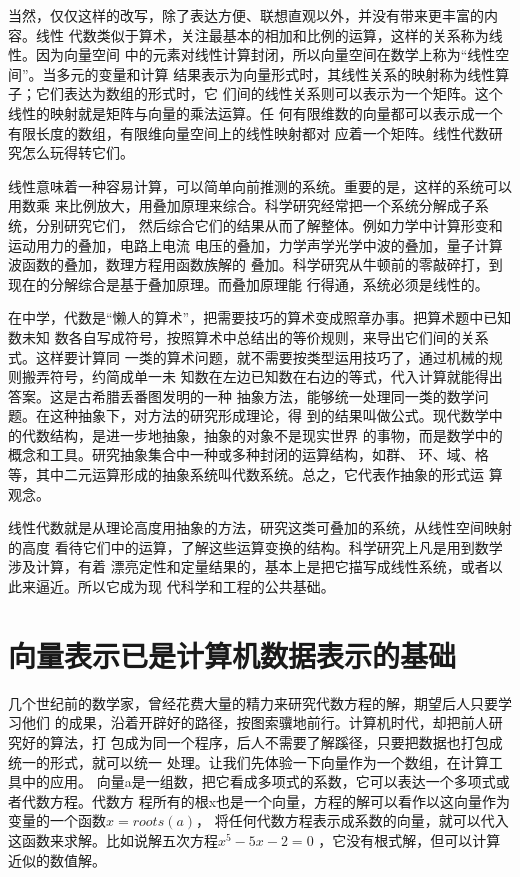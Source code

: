 当然，仅仅这样的改写，除了表达方便、联想直观以外，并没有带来更丰富的内容。线性
代数类似于算术，关注最基本的相加和比例的运算，这样的关系称为线性。因为向量空间
中的元素对线性计算封闭，所以向量空间在数学上称为``线性空间''。当多元的变量和计算
结果表示为向量形式时，其线性关系的映射称为线性算子；它们表达为数组的形式时，它
们间的线性关系则可以表示为一个矩阵。这个线性的映射就是矩阵与向量的乘法运算。任
何有限维数的向量都可以表示成一个有限长度的数组，有限维向量空间上的线性映射都对
应着一个矩阵。线性代数研究怎么玩得转它们。

线性意味着一种容易计算，可以简单向前推测的系统。重要的是，这样的系统可以用数乘
来比例放大，用叠加原理来综合。科学研究经常把一个系统分解成子系统，分别研究它们，
然后综合它们的结果从而了解整体。例如力学中计算形变和运动用力的叠加，电路上电流
电压的叠加，力学声学光学中波的叠加，量子计算波函数的叠加，数理方程用函数族解的
叠加。科学研究从牛顿前的零敲碎打，到现在的分解综合是基于叠加原理。而叠加原理能
行得通，系统必须是线性的。

在中学，代数是``懒人的算术''，把需要技巧的算术变成照章办事。把算术题中已知数未知
数各自写成符号，按照算术中总结出的等价规则，来导出它们间的关系式。这样要计算同
一类的算术问题，就不需要按类型运用技巧了，通过机械的规则搬弄符号，约简成单一未
知数在左边已知数在右边的等式，代入计算就能得出答案。这是古希腊丢番图发明的一种
抽象方法，能够统一处理同一类的数学问题。在这种抽象下，对方法的研究形成理论，得
到的结果叫做公式。现代数学中的代数结构，是进一步地抽象，抽象的对象不是现实世界
的事物，而是数学中的概念和工具。研究抽象集合中一种或多种封闭的运算结构，如群、
环、域、格等，其中二元运算形成的抽象系统叫代数系统。总之，它代表作抽象的形式运
算观念。

线性代数就是从理论高度用抽象的方法，研究这类可叠加的系统，从线性空间映射的高度
看待它们中的运算，了解这些运算变换的结构。科学研究上凡是用到数学涉及计算，有着
漂亮定性和定量结果的，基本上是把它描写成线性系统，或者以此来逼近。所以它成为现
代科学和工程的公共基础。

\section{向量表示已是计算机数据表示的基础}

几个世纪前的数学家，曾经花费大量的精力来研究代数方程的解，期望后人只要学习他们
的成果，沿着开辟好的路径，按图索骥地前行。计算机时代，却把前人研究好的算法，打
包成为同一个程序，后人不需要了解蹊径，只要把数据也打包成统一的形式，就可以统一
处理。让我们先体验一下向量作为一个数组，在计算工具中的应用。
\kaishu
向量a是一组数，把它看成多项式的系数，它可以表达一个多项式或者代数方程。代数方
程所有的根x也是一个向量，方程的解可以看作以这向量作为变量的一个函数$ x=roots(a) $，
将任何代数方程表示成系数的向量，就可以代入这函数来求解。比如说解五次方程$ x^5-5x-2=0  $ 
，它没有根式解，但可以计算近似的数值解。

